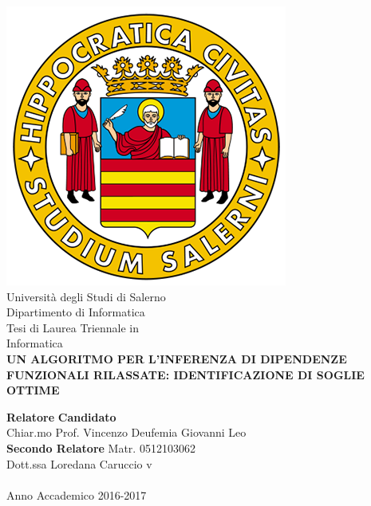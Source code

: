 \begin{center}
    \includegraphics[scale = 0.30]{Immagini/logoUnisa.png}\\
    \vspace{1cm}
    {\Large Università degli Studi di Salerno}\\[0.2truecm]
    {\large Dipartimento di Informatica}\\
    \hrulefill
    \vfill
    {\large Tesi di Laurea Triennale in }\\[0.2truecm]
    {\Large Informatica}\\
    \vfill
    {\large \bf UN ALGORITMO PER L'INFERENZA DI DIPENDENZE 
    FUNZIONALI RILASSATE: IDENTIFICAZIONE DI SOGLIE OTTIME}
    \vfill\vfill
    
    {\bf Relatore} \hfill {\bf Candidato} \\
    Chiar.mo Prof. Vincenzo Deufemia \hfill Giovanni Leo \\
    {\bf Secondo Relatore}
    \hfill Matr. 0512103062\\
    
    
    Dott.ssa Loredana Caruccio  \hfill {\phantom v} \\
    \vspace{1cm}
    \hrulefill \\
  	\vspace{1cm}
    Anno Accademico 2016-2017
\end{center}
